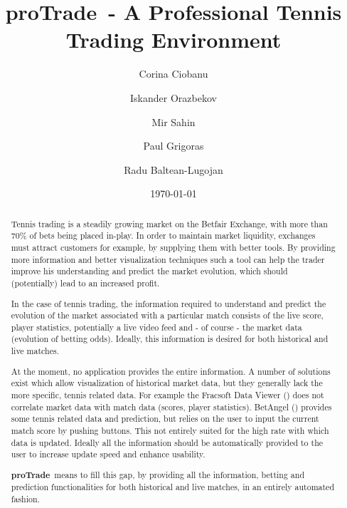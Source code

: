 \documentclass[10pt]{report}
\newcommand{\nm}{{\bf proTrade}}
\newcommand{\nmsp}{{\nm \ }}
\begin{document}
\title{\nmsp - A Professional Tennis Trading Environment}

\author{Corina Ciobanu \and Iskander Orazbekov \and Mir Sahin \and Paul Grigoras \and Radu Baltean-Lugojan}

\date{\today}         %

\maketitle            %

\begin{abstract}
Tennis trading is a steadily growing market on the Betfair Exchange, with more than 70\% of bets being placed in-play. In order to maintain market liquidity, exchanges must attract customers for example, by supplying them with better tools. By providing more information and better visualization techniques such a tool can help the trader improve his understanding and predict the market evolution, which should (potentially) lead to an increased profit.

In the case of tennis trading, the information required to understand and predict the evolution of the market associated with a particular match consists of the live score, player statistics, potentially a live video feed and - of course - the market data (evolution of betting odds). Ideally, this information is desired for both historical and live matches.

At the moment, no application provides the entire information. A number of solutions exist which allow visualization of historical market data, but they generally lack the more specific, tennis related data. For example the Fracsoft Data Viewer (\cite{site-fracsoft}) does not correlate market data with match data (scores, player statistics). BetAngel (\cite{site-betangel}) provides some tennis related data and prediction, but relies on the user to input the current match score by pushing buttons. This not entirely suited for the high rate with which data is updated. Ideally all the information should be automatically provided to the user to increase update speed and enhance usability.

\nmsp means to fill this gap, by providing all the information, betting and prediction functionalities for both historical and live matches, in an entirely automated fashion.

\end{abstract}
\end{document}
